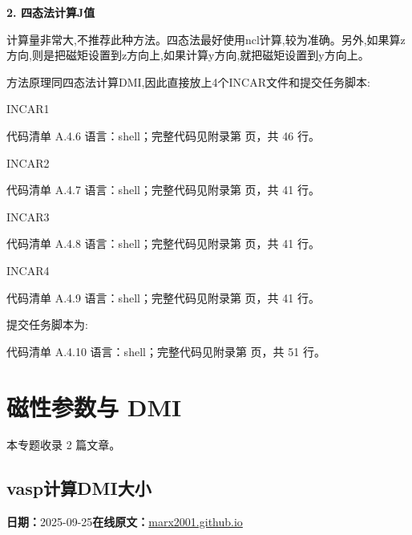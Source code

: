 \documentclass[lang=cn,scheme=chinese,color=blue,device=normal,toc=onecol,math=cm]{elegantbook}
\begin{document}
\textbf{ 2. 四态法计算J值}\par


计算量非常大,不推荐此种方法。四态法最好使用ncl计算,较为准确。另外,如果算z方向,则是把磁矩设置到z方向上,如果计算y方向,就把磁矩设置到y方向上。\par


方法原理同四态法计算DMI,因此直接放上4个INCAR文件和提交任务脚本:\par


INCAR1\par


\begin{codeindexbox}{代码清单 A.4.6}
语言：shell；完整代码见附录第 \pageref{code:4:6} 页，共 46 行。
\end{codeindexbox}


INCAR2\par


\begin{codeindexbox}{代码清单 A.4.7}
语言：shell；完整代码见附录第 \pageref{code:4:7} 页，共 41 行。
\end{codeindexbox}


INCAR3\par


\begin{codeindexbox}{代码清单 A.4.8}
语言：shell；完整代码见附录第 \pageref{code:4:8} 页，共 41 行。
\end{codeindexbox}


INCAR4\par


\begin{codeindexbox}{代码清单 A.4.9}
语言：shell；完整代码见附录第 \pageref{code:4:9} 页，共 41 行。
\end{codeindexbox}


提交任务脚本为:\par


\begin{codeindexbox}{代码清单 A.4.10}
语言：shell；完整代码见附录第 \pageref{code:4:10} 页，共 51 行。
\end{codeindexbox}


\chapter{磁性参数与 DMI}
\begin{partbox}本专题收录 2 篇文章。\end{partbox}

\section{vasp计算DMI大小}
\begin{articlemeta}
\textbf{日期：}2025-09-25\hfill\textbf{在线原文：}\href{https://marx2001.github.io/sci-note\_posts/20250925-D}{marx2001.github.io}
\end{articlemeta}
\end{document}
